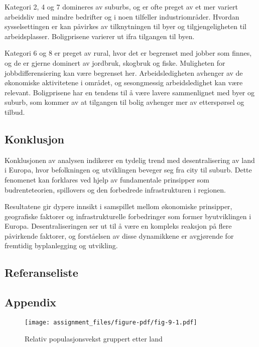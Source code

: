 \documentclass[
  letterpaper,
  DIV=11,
  numbers=noendperiod]{scrartcl}
\begin{document}
Kategori 2, 4 og 7 domineres av suburbs, og er ofte preget av et mer
variert arbeidsliv med mindre bedrifter og i noen tilfeller
industriområder. Hvordan sysselsettingen er kan påvirkes av
tilknytningen til byer og tilgjengeligheten til arbeidsplasser.
Boligprisene varierer ut ifra tilgangen til byen.~

Kategori 6 og 8 er preget av rural, hvor det er begrenset med jobber som
finnes, og de er gjerne dominert av jordbruk, skogbruk og fiske.
Muligheten for jobbdifferensiering kan være begrenset her.
Arbeidsledigheten avhenger av de økonomiske aktivitetene i området, og
sesongmessig arbeidsledighet kan være relevant. Boligprisene har en
tendens til å være lavere sammenlignet med byer og suburb, som kommer av
at tilgangen til bolig avhenger mer av etterspørsel og tilbud.

\hypertarget{konklusjon}{%
\subsection{Konklusjon}\label{konklusjon}}

Konklusjonen av analysen indikerer en tydelig trend med desentralisering
av land i Europa, hvor befolkningen og utviklingen beveger seg fra city
til suburb. Dette fenomenet kan forklares ved hjelp av fundamentale
prinsipper som budrenteteorien, spillovers og den forbedrede
infrastrukturen i regionen.

Resultatene gir dypere innsikt i samspillet mellom økonomiske
prinsipper, geografiske faktorer og infrastrukturelle forbedringer som
former byutviklingen i Europa. Desentraliseringen ser ut til å være en
kompleks reaksjon på flere påvirkende faktorer, og forståelsen av disse
dynamikkene er avgjørende for fremtidig byplanlegging og utvikling.

\hypertarget{referanseliste}{%
\subsection{Referanseliste}\label{referanseliste}}

\hypertarget{appendix}{%
\subsection{Appendix}\label{appendix}}

\begin{figure}

{\centering \texttt{[image: assignment\_files/figure-pdf/fig-9-1.pdf]}

}

\caption{\label{fig-9}Relativ populasjonsvekst gruppert etter land}

\end{figure}
\end{document}
